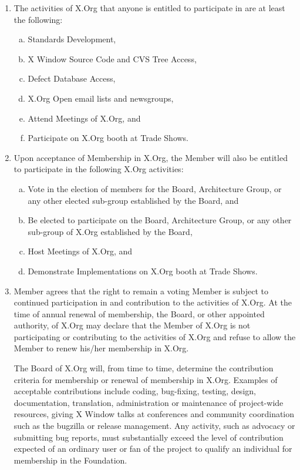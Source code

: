\documentclass[10pt, english]{xorgdocs}
\begin{document}
\begin{enumerate}[(1)\hspace{.2cm}]
	\item The activities of X.Org that anyone is entitled to participate
	in are at least the following:

	\begin{enumerate}[(a)\hspace{.2cm}]
		\item Standards Development,
		\item X Window Source Code and CVS Tree Access,
		\item Defect Database Access,
		\item X.Org Open email lists and newsgroups,
		\item Attend Meetings of X.Org, and
		\item Participate on X.Org booth at Trade Shows.
	\end{enumerate}

	\item Upon acceptance of Membership in X.Org, the Member will also be
	entitled to participate in the following X.Org activities:

	\begin{enumerate}[(a)\hspace{.2cm}]
		\item Vote in the election of members for the Board,
		Architecture Group, or any other elected sub-group established
		by the Board, and
		\item Be elected to participate on the Board, Architecture
		Group, or any other sub-group of X.Org established by the
		Board,
		\item Host Meetings of X.Org, and
		\item Demonstrate Implementations on X.Org booth at Trade
		Shows.
	\end{enumerate}

	\item Member agrees that the right to remain a voting Member is
	subject to continued participation in and contribution to the
	activities of X.Org. At the time of annual renewal of membership,
	the Board, or other appointed authority, of X.Org may declare that
	the Member of X.Org is not participating or contributing to the
	activities of X.Org and refuse to allow the Member to renew his/her
	membership in X.Org.

	The Board of X.Org will, from time to time, determine the contribution
	criteria for membership or renewal of membership in X.Org. Examples
	of acceptable contributions include coding, bug-fixing, testing,
	design, documentation, translation, administration or maintenance of
	project-wide resources, giving X Window talks at conferences and
	community coordination such as the bugzilla or release management.
	Any activity, such as advocacy or submitting bug reports, must
	substantially exceed the level of contribution expected of an ordinary
	user or fan of the project to qualify an individual for membership in
	the Foundation.


\end{enumerate}
\end{document}
